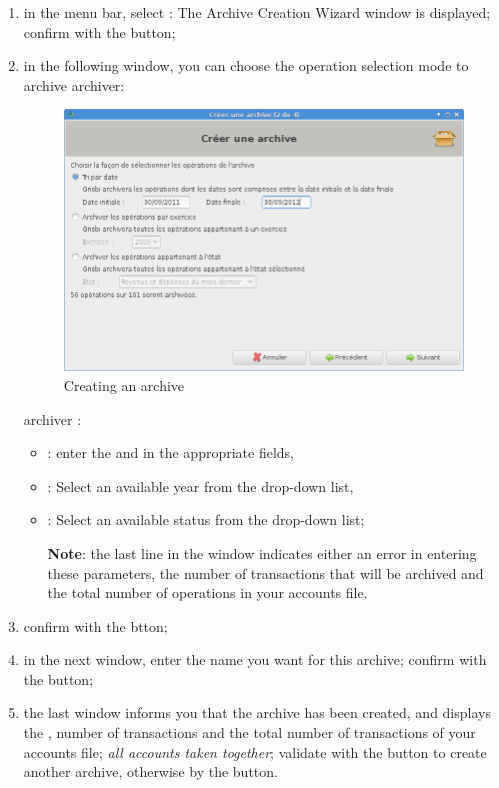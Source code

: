 \begin{enumerate}
	\item in the menu bar, select  : The Archive Creation Wizard window is displayed; confirm with the  button;
	\item in the following window, you can choose the operation selection mode to archive  \ifIllustration archiver:
	\begin{figure}[htbp]
	\begin{center}
	\includegraphics[scale=0.5]{image/screenshot/datamanagement_history_create}
	\end{center}
	\caption{Creating an archive}
	\label{datamanagement-history-create-img}
	\end{figure}
	\else archiver :
	\fi
	
		\begin{itemize}
			\item {}: enter the  and  in the appropriate fields,
			\item {}: Select an available year from the drop-down list,
			\item {}: Select an available status from the drop-down list;

			\textbf{Note}: the last line in the window indicates either an error in entering these parameters, the number of transactions that will be archived and the total number of operations in your accounts file.  
		\end{itemize}
	\item confirm with the  btton;
	\item in the next window, enter the name you want for this archive; confirm with the   button;
	\item the last window informs you that the archive has been created, and displays the , number of transactions and the total number of transactions of your accounts file;  \emph{all accounts taken together};  validate with the  button to create another archive, otherwise by the  button.
\end{enumerate}


